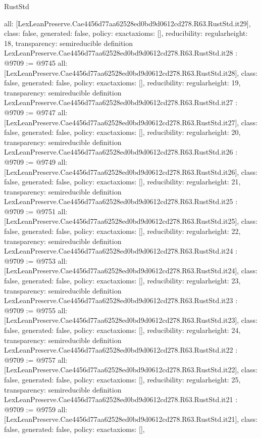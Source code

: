\begin{lexlean}{RustStd}
\begin{coremodule}
{  all: [LexLeanPreserve.Cae4456d77aa62528ed0bd9d0612cd278.R63.RustStd.it29],
  class: false,
  generated: false,
  policy: exact{axioms: []},
  reducibility: regular{height: 18},
  transparency: semireducible
}
definition LexLeanPreserve.Cae4456d77aa62528ed0bd9d0612cd278.R63.RustStd.it28 : @9709 := @9745 {
  all: [LexLeanPreserve.Cae4456d77aa62528ed0bd9d0612cd278.R63.RustStd.it28],
  class: false,
  generated: false,
  policy: exact{axioms: []},
  reducibility: regular{height: 19},
  transparency: semireducible
}
definition LexLeanPreserve.Cae4456d77aa62528ed0bd9d0612cd278.R63.RustStd.it27 : @9709 := @9747 {
  all: [LexLeanPreserve.Cae4456d77aa62528ed0bd9d0612cd278.R63.RustStd.it27],
  class: false,
  generated: false,
  policy: exact{axioms: []},
  reducibility: regular{height: 20},
  transparency: semireducible
}
definition LexLeanPreserve.Cae4456d77aa62528ed0bd9d0612cd278.R63.RustStd.it26 : @9709 := @9749 {
  all: [LexLeanPreserve.Cae4456d77aa62528ed0bd9d0612cd278.R63.RustStd.it26],
  class: false,
  generated: false,
  policy: exact{axioms: []},
  reducibility: regular{height: 21},
  transparency: semireducible
}
definition LexLeanPreserve.Cae4456d77aa62528ed0bd9d0612cd278.R63.RustStd.it25 : @9709 := @9751 {
  all: [LexLeanPreserve.Cae4456d77aa62528ed0bd9d0612cd278.R63.RustStd.it25],
  class: false,
  generated: false,
  policy: exact{axioms: []},
  reducibility: regular{height: 22},
  transparency: semireducible
}
definition LexLeanPreserve.Cae4456d77aa62528ed0bd9d0612cd278.R63.RustStd.it24 : @9709 := @9753 {
  all: [LexLeanPreserve.Cae4456d77aa62528ed0bd9d0612cd278.R63.RustStd.it24],
  class: false,
  generated: false,
  policy: exact{axioms: []},
  reducibility: regular{height: 23},
  transparency: semireducible
}
definition LexLeanPreserve.Cae4456d77aa62528ed0bd9d0612cd278.R63.RustStd.it23 : @9709 := @9755 {
  all: [LexLeanPreserve.Cae4456d77aa62528ed0bd9d0612cd278.R63.RustStd.it23],
  class: false,
  generated: false,
  policy: exact{axioms: []},
  reducibility: regular{height: 24},
  transparency: semireducible
}
definition LexLeanPreserve.Cae4456d77aa62528ed0bd9d0612cd278.R63.RustStd.it22 : @9709 := @9757 {
  all: [LexLeanPreserve.Cae4456d77aa62528ed0bd9d0612cd278.R63.RustStd.it22],
  class: false,
  generated: false,
  policy: exact{axioms: []},
  reducibility: regular{height: 25},
  transparency: semireducible
}
definition LexLeanPreserve.Cae4456d77aa62528ed0bd9d0612cd278.R63.RustStd.it21 : @9709 := @9759 {
  all: [LexLeanPreserve.Cae4456d77aa62528ed0bd9d0612cd278.R63.RustStd.it21],
  class: false,
  generated: false,
  policy: exact{axioms: []},
}
\end{coremodule}
\end{lexlean}
